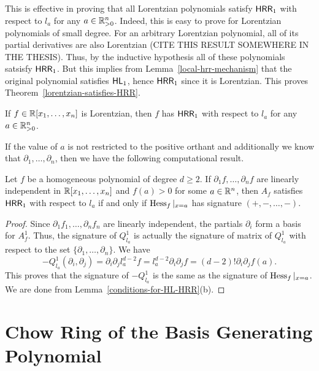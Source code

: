 \documentclass{puthesis-UG}
\begin{document}
This is effective in proving that all Lorentzian polynomials satisfy $\mathsf{HRR}_1$ with respect to $l_a$ for any $a \in \mathbb{R}^n_{> 0}$. Indeed, this is easy to prove for Lorentzian polynomials of small degree. For an arbitrary Lorentzian polynomial, all of its partial derivatives are also Lorentzian (CITE THIS RESULT SOMEWHERE IN THE THESIS). Thus, by the inductive hypothesis all of these polynomials satsisfy $\mathsf{HRR}_1$. But this implies from Lemma~\ref{local-hrr-mechanism} that the original polynomial satisfies $\mathsf{HL}_1$, hence $\mathsf{HRR}_1$ since it is Lorentzian. This proves Theorem~\ref{lorentzian-satisfies-HRR}.

\begin{thm}  \label{lorentzian-satisfies-HRR}
	If $f \in \mathbb{R}[x_1, \ldots, x_n]$ is Lorentzian, then $f$ has $\mathsf{HRR}_1$ with respect to $l_a$ for any $a \in \mathbb{R}_{> 0}^n$. 
\end{thm}

If the value of $a$ is not restricted to the positive orthant and additionally we know that $\partial_1, \ldots, \partial_n$, then we have the following computational result. 

\begin{cor} \label{partial-independent-implies-hessian}
	Let $f$ be a homogeneous polynomial of degree $d \geq 2$. If $\partial_1 f, \ldots, \partial_n f$ are linearly independent in $\mathbb{R}[x_1, \ldots, x_n]$ and $f(a) > 0$ for some $a \in \mathbb{R}^n$, then $A_f$ satisfies $\mathsf{HRR}_1$ with respect to $l_a$ if and only if $\operatorname{Hess}_f|_{x = a}$ has signature $(+, -, \ldots, -)$. 
\end{cor}

\begin{proof}
	Since $\partial_1 f_1, \ldots, \partial_n f_n$ are linearly independent, the partials $\partial_i$ form a basis for $A_f^1$. Thus, the signature of $Q_{l_a}^1$ is actually the signature of matrix of $Q_{l_a}^1$ with respect to the set $\{\partial_1, \ldots, \partial_n\}.$ We have 
	\[
		-Q_{l_a}^1(\partial_i, \partial_j) = \partial_i \partial_j l_a^{d-2} f =  l_a^{d-2} \partial_i \partial_j f = (d-2)! \partial_i \partial_j f(a).
	\]
	This proves that the signature of $-Q^1_{l_a}$ is the same as the signature of $\operatorname{Hess}_f |_{x = a}$.  We are done from Lemma~\ref{conditions-for-HL-HRR}(b).
\end{proof}
\section{Chow Ring of the Basis Generating Polynomial}
\end{document}
